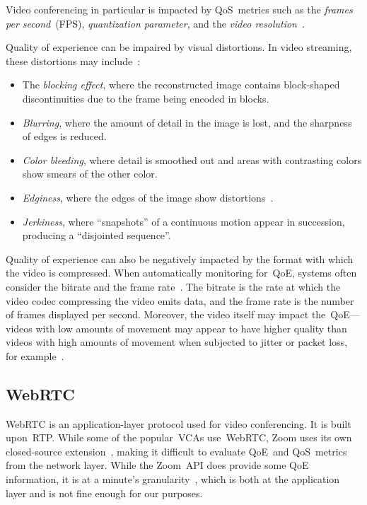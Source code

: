         Video conferencing in particular is impacted by QoS~metrics such as the \emph{frames per second}~(FPS), \emph{quantization parameter}, and the \emph{video resolution}~\autocite{MacMillanKyle2021MtPa}.

        Quality of experience can be impaired by visual distortions. In video streaming, these distortions may include~\autocite{YuenMichael1998Asoh}:
        \begin{itemize}
            \item The \emph{blocking effect}, where the reconstructed image contains block-shaped discontinuities due to the frame being encoded in blocks.
            \item \emph{Blurring}, where the amount of detail in the image is lost, and the sharpness of edges is reduced.
            \item \emph{Color bleeding}, where detail is smoothed out and areas with contrasting colors show smears of the other color.
            \item \emph{Edginess}, where the edges of the image show distortions~\autocite{ChenYanjiao2015FQtQ}.
            \item \emph{Jerkiness}, where \enquote{snapshots} of a continuous motion appear in succession, producing a \enquote{disjointed sequence}.
        \end{itemize}

        Quality of experience can also be negatively impacted by the format with which the video is compressed. When automatically monitoring for~QoE, systems often consider the bitrate and the frame rate~\autocite{ChenYanjiao2015FQtQ}. The bitrate is the rate at which the video codec compressing the video emits data, and the frame rate is the number of frames displayed per second. Moreover, the video itself may impact the~QoE---videos with low amounts of movement may appear to have higher quality than videos with high amounts of movement when subjected to jitter or packet loss, for example~\autocite{ChenYanjiao2015FQtQ}.


    \subsection{WebRTC}\label{introduction:webrtc}
        WebRTC is an application-layer protocol used for video conferencing. It is built upon~RTP. While some of the popular~VCAs use~WebRTC, Zoom uses its own closed-source extension~\autocite{marczak2020}, making it difficult to evaluate QoE~and QoS~metrics from the network layer. While the Zoom~API does provide some QoE information, it is at a minute's granularity~\autocite{walia2019}, which is both at the application layer and is not fine enough for our purposes.

